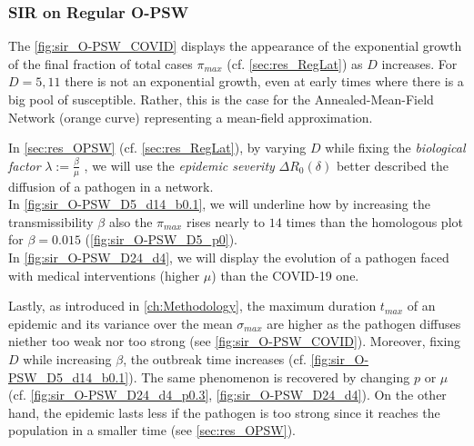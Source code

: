 \documentclass[a4paper,10pt,twoside]{book} %
\theoremstyle{definition}
\begin{document}
\subsubsection*{SIR on Regular O-PSW}
The \autoref{fig:sir_O-PSW_COVID} displays the appearance of the exponential growth of the final fraction of total cases $ \pi_{max}$ (cf. \autoref{sec:res_RegLat}) as $D$ increases. For $ D = 5, 11$ there is not an exponential growth, even at early times where there is a big pool of susceptible. Rather, this is the case for the Annealed-Mean-Field Network (orange curve) representing a mean-field approximation.

In \autoref{sec:res_OPSW} (cf. \autoref{sec:res_RegLat}), by varying $D$ while fixing the \textit{biological factor}  $\lambda:=\frac{\beta}{ \mu}$ , we will use the \textit{epidemic severity}  $\Delta R_0 (\delta)$ better described the diffusion of a pathogen in a network.\\
In \autoref{fig:sir_O-PSW_D5_d14_b0.1}, we will underline how by increasing the transmissibility $ \beta$  also the $ \pi_{max}$ rises nearly to $ 14$ times than the homologous plot for $ \beta = 0.015$ (\autoref{fig:sir_O-PSW_D5_p0}).\\
In \autoref{fig:sir_O-PSW_D24_d4}, we will display the evolution of a pathogen faced with medical interventions (higher $ \mu$) than the COVID-19 one.

Lastly, as introduced in \autoref{ch:Methodology}, the maximum duration $t_{max}$ of an epidemic and its variance over the mean $\sigma_{max}$ are higher as the pathogen diffuses niether too weak nor too strong (see \autoref{fig:sir_O-PSW_COVID}). Moreover, fixing $D$ while increasing $ \beta$, the outbreak time increases (cf. \autoref{fig:sir_O-PSW_D5_d14_b0.1}). The same phenomenon is recovered by changing $ p$ or $ \mu$  (cf. \autoref{fig:sir_O-PSW_D24_d4_p0.3}, \autoref{fig:sir_O-PSW_D24_d4}). 
On the other hand, the epidemic lasts less if the pathogen is too strong since it reaches the population in a smaller time (see \autoref{sec:res_OPSW}).
\end{document}
